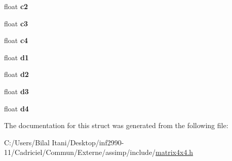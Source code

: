 \begin{DoxyCompactItemize}
\item 
float {\bfseries c2}\hypertarget{structai_matrix4x4_a67425f81054b1097c29b73bf317cfeeb}{}\label{structai_matrix4x4_a67425f81054b1097c29b73bf317cfeeb}

\item 
float {\bfseries c3}\hypertarget{structai_matrix4x4_aec8c5745b90139d472eb4e91f1373c1a}{}\label{structai_matrix4x4_aec8c5745b90139d472eb4e91f1373c1a}

\item 
float {\bfseries c4}\hypertarget{structai_matrix4x4_a7e3288f38a4e00d55c02272e1582e462}{}\label{structai_matrix4x4_a7e3288f38a4e00d55c02272e1582e462}

\item 
float {\bfseries d1}\hypertarget{structai_matrix4x4_a13f3800d9106e3be6d0e60b794c5a5ae}{}\label{structai_matrix4x4_a13f3800d9106e3be6d0e60b794c5a5ae}

\item 
float {\bfseries d2}\hypertarget{structai_matrix4x4_a6f17ca1c7e4b9377d0e332f85aab282b}{}\label{structai_matrix4x4_a6f17ca1c7e4b9377d0e332f85aab282b}

\item 
float {\bfseries d3}\hypertarget{structai_matrix4x4_a8d2910f62b34b1e2ace93b55e4db4b92}{}\label{structai_matrix4x4_a8d2910f62b34b1e2ace93b55e4db4b92}

\item 
float {\bfseries d4}\hypertarget{structai_matrix4x4_ac0a65b51f126f7331b4f7dbbd82f3d63}{}\label{structai_matrix4x4_ac0a65b51f126f7331b4f7dbbd82f3d63}

\end{DoxyCompactItemize}


The documentation for this struct was generated from the following file\+:\begin{DoxyCompactItemize}
\item 
C\+:/\+Users/\+Bilal Itani/\+Desktop/inf2990-\/11/\+Cadriciel/\+Commun/\+Externe/assimp/include/\hyperlink{matrix4x4_8h}{matrix4x4.\+h}\end{DoxyCompactItemize}
